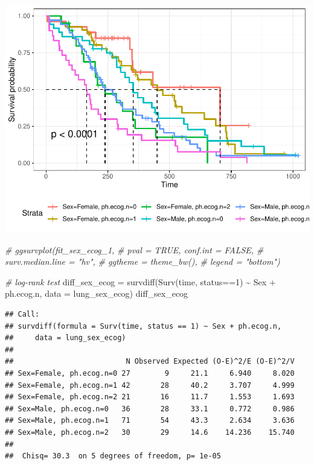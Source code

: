 \documentclass[
]{article}
\newenvironment{Shaded}{\begin{snugshade}}{\end{snugshade}}
\newcommand{\AttributeTok}[1]{\textcolor[rgb]{0.77,0.63,0.00}{#1}}
\newcommand{\CommentTok}[1]{\textcolor[rgb]{0.56,0.35,0.01}{\textit{#1}}}
\newcommand{\DecValTok}[1]{\textcolor[rgb]{0.00,0.00,0.81}{#1}}
\newcommand{\FunctionTok}[1]{\textcolor[rgb]{0.00,0.00,0.00}{#1}}
\newcommand{\NormalTok}[1]{#1}
\newcommand{\OtherTok}[1]{\textcolor[rgb]{0.56,0.35,0.01}{#1}}
\newcommand{\SpecialCharTok}[1]{\textcolor[rgb]{0.00,0.00,0.00}{#1}}
\begin{document}
\includegraphics{final_project_files/figure-latex/unnamed-chunk-23-1.pdf}

\begin{Shaded}
\begin{Highlighting}[]
\CommentTok{\# ggsurvplot(fit\_sex\_ecog\_1,}
\CommentTok{\#          pval = TRUE, conf.int = FALSE,}
\CommentTok{\#          surv.median.line = "hv", }
\CommentTok{\#          ggtheme = theme\_bw(), }
\CommentTok{\#          legend = "bottom")}

\CommentTok{\# log{-}rank test}
\NormalTok{diff\_sex\_ecog }\OtherTok{=} \FunctionTok{survdiff}\NormalTok{(}\FunctionTok{Surv}\NormalTok{(time, status}\SpecialCharTok{==}\DecValTok{1}\NormalTok{) }\SpecialCharTok{\textasciitilde{}}\NormalTok{ Sex }\SpecialCharTok{+}\NormalTok{ ph.ecog.n, }\AttributeTok{data =}\NormalTok{ lung\_sex\_ecog) }
\NormalTok{diff\_sex\_ecog}
\end{Highlighting}
\end{Shaded}

\begin{verbatim}
## Call:
## survdiff(formula = Surv(time, status == 1) ~ Sex + ph.ecog.n, 
##     data = lung_sex_ecog)
## 
##                          N Observed Expected (O-E)^2/E (O-E)^2/V
## Sex=Female, ph.ecog.n=0 27        9     21.1     6.940     8.020
## Sex=Female, ph.ecog.n=1 42       28     40.2     3.707     4.999
## Sex=Female, ph.ecog.n=2 21       16     11.7     1.553     1.693
## Sex=Male, ph.ecog.n=0   36       28     33.1     0.772     0.986
## Sex=Male, ph.ecog.n=1   71       54     43.3     2.634     3.636
## Sex=Male, ph.ecog.n=2   30       29     14.6    14.236    15.740
## 
##  Chisq= 30.3  on 5 degrees of freedom, p= 1e-05
\end{verbatim}
\end{document}
